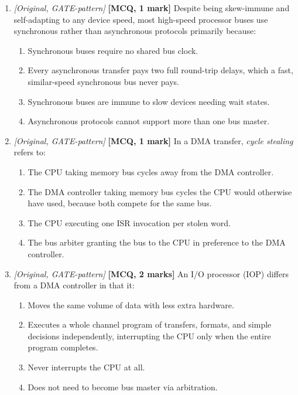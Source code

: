 \documentclass[11pt]{article}
\begin{document}
\begin{enumerate}
\item[\textbf{Q9}] \textit{[Original, GATE-pattern]} \textbf{[MCQ, 1 mark]} Despite being skew-immune and self-adapting to any device speed, most high-speed processor buses use synchronous rather than asynchronous protocols primarily because:
\begin{enumerate}
  \item[(A)] Synchronous buses require no shared bus clock.
  \item[(B)] Every asynchronous transfer pays two full round-trip delays, which a fast, similar-speed synchronous bus never pays.
  \item[(C)] Synchronous buses are immune to slow devices needing wait states.
  \item[(D)] Asynchronous protocols cannot support more than one bus master.
\end{enumerate}

\item[\textbf{Q10}] \textit{[Original, GATE-pattern]} \textbf{[MCQ, 1 mark]} In a DMA transfer, \emph{cycle stealing} refers to:
\begin{enumerate}
  \item[(A)] The CPU taking memory bus cycles away from the DMA controller.
  \item[(B)] The DMA controller taking memory bus cycles the CPU would otherwise have used, because both compete for the same bus.
  \item[(C)] The CPU executing one ISR invocation per stolen word.
  \item[(D)] The bus arbiter granting the bus to the CPU in preference to the DMA controller.
\end{enumerate}

\item[\textbf{Q11}] \textit{[Original, GATE-pattern]} \textbf{[MCQ, 2 marks]} An I/O processor (IOP) differs from a DMA controller in that it:
\begin{enumerate}
  \item[(A)] Moves the same volume of data with less extra hardware.
  \item[(B)] Executes a whole channel program of transfers, formats, and simple decisions independently, interrupting the CPU only when the entire program completes.
  \item[(C)] Never interrupts the CPU at all.
  \item[(D)] Does not need to become bus master via arbitration.
\end{enumerate}

\end{enumerate}
\end{document}
